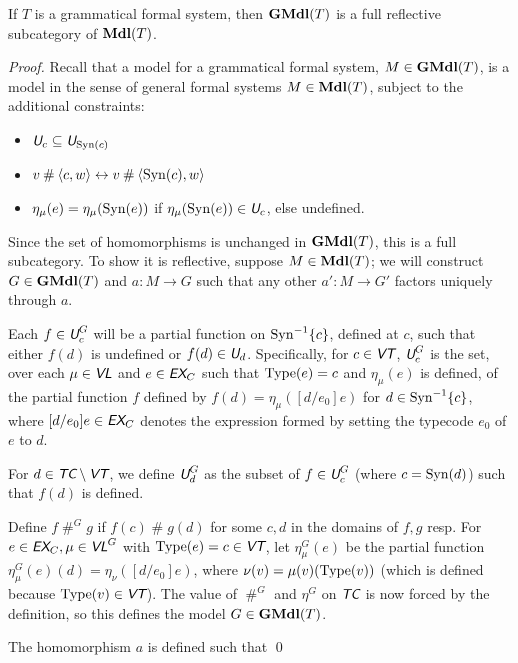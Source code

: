\documentclass[runningheads,a4paper]{llncs}
\newcommand{\ec}{\textit{\textsf{EX}}_C} %
\newcommand{\tc}{\textit{\textsf{TC}}} %
\newcommand{\vt}{\textit{\textsf{VT}}} %
\newcommand{\vl}{\textit{\textsf{VL}}} %
\newcommand{\uv}{\textit{\textsf{U}}} %
\newcommand{\ang}[1]{\langle#1\rangle}
\newcommand{\type}{{\rm Type}}
\newcommand{\syn}{{\rm Syn}}
\newcommand{\fresh}{\mathbin{\#}}
\begin{document}
\begin{theorem}\label{sec:resfunc}
If $T$ is a grammatical formal system, then ${\bf GMdl}(T)$ is a full reflective subcategory of ${\bf Mdl}(T)$. 
\end{theorem}
\begin{proof}
Recall that a model for a grammatical formal system, $M\in{\bf GMdl}(T)$, is a model in the sense of general formal systems $M\in{\bf Mdl}(T)$, subject to the additional constraints:
\begin{itemize}
  \item $\uv_c\subseteq\uv_{\syn(c)}$
  \item $v\fresh\ang{c,w}\leftrightarrow v\fresh\ang{\syn(c),w}$ 
  \item $\eta_\mu(e)=\eta_\mu(\syn(e))$ if $\eta_\mu(\syn(e))\in\uv_c$, else undefined.
\end{itemize}

Since the set of homomorphisms is unchanged in ${\bf GMdl}(T)$, this is a full subcategory. To show it is reflective, suppose $M\in{\bf Mdl}(T)$; we will construct $G\in{\bf GMdl}(T)$ and $a:M\to G$ such that any other $a':M\to G'$ factors uniquely through $a$.

Each $f\in\uv^G_c$ will be a partial function on $\syn^{-1}\{c\}$, defined at $c$, such that either $f(d)$ is undefined or $f(d)\in\uv_d$. Specifically, for $c\in\vt$, $\uv^G_c$ is the set, over each $\mu\in\vl$ and $e\in\ec$ such that $\type(e)=c$ and $\eta_\mu(e)$ is defined, of the partial function $f$ defined by $f(d)=\eta_\mu([d/e_0]e)$ for $d\in\syn^{-1}\{c\}$, where $[d/e_0]e\in\ec$ denotes the expression formed by setting the typecode $e_0$ of $e$ to $d$.

For $d\in\tc\setminus\vt$, we define $\uv^G_d$ as the subset of $f\in\uv^G_c$ (where $c=\syn(d)$) such that $f(d)$ is defined.

Define $f\fresh^Gg$ if $f(c)\fresh g(d)$ for some $c,d$ in the domains of $f,g$ resp. For $e\in\ec,\mu\in\vl^G$ with $\type(e)=c\in\vt$, let $\eta^G_\mu(e)$ be the partial function $\eta^G_\mu(e)(d)=\eta_\nu([d/e_0]e)$, where $\nu(v)=\mu(v)(\type(v))$ (which is defined because $\type(v)\in\vt$). The value of $\fresh^G$ and $\eta^G$ on $\tc$ is now forced by the definition, so this defines the model $G\in{\bf GMdl}(T)$.

The homomorphism $a$ is defined such that 
\qed\end{proof}
\end{document}
